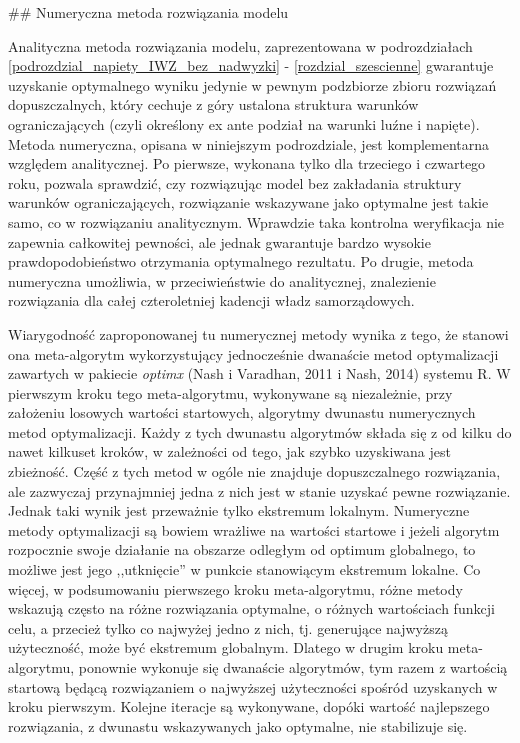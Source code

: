 ## Numeryczna metoda rozwiązania modelu
\label{rozdz_numeryczna_metoda}

Analityczna metoda rozwiązania modelu, zaprezentowana w podrozdziałach \ref{podrozdzial_napiety_IWZ_bez_nadwyzki} - \ref{rozdzial_szescienne} gwarantuje uzyskanie optymalnego wyniku jedynie w pewnym podzbiorze zbioru rozwiązań dopuszczalnych, który cechuje z góry ustalona struktura warunków ograniczających (czyli określony ex ante podział na warunki luźne i napięte). Metoda numeryczna, opisana w niniejszym podrozdziale, jest komplementarna względem analitycznej. Po pierwsze, wykonana tylko dla trzeciego i czwartego roku, pozwala sprawdzić, czy rozwiązując model bez zakładania struktury warunków ograniczających, rozwiązanie wskazywane jako optymalne jest takie samo, co w rozwiązaniu analitycznym. Wprawdzie taka kontrolna weryfikacja nie zapewnia całkowitej pewności, ale jednak gwarantuje bardzo wysokie prawdopodobieństwo otrzymania optymalnego rezultatu. Po drugie, metoda numeryczna umożliwia, w przeciwieństwie do analitycznej, znalezienie rozwiązania dla całej czteroletniej kadencji władz samorządowych.  

Wiarygodność zaproponowanej tu numerycznej metody wynika z tego, że stanowi ona meta-algorytm wykorzystujący jednocześnie dwanaście metod optymalizacji zawartych w pakiecie \textit{optimx} (Nash i Varadhan, 2011 i Nash, 2014)\nocite{Nash_Varadhan_2011}\nocite{Nash_2014} systemu R. W pierwszym kroku tego meta-algorytmu, wykonywane są niezależnie, przy założeniu losowych wartości startowych, algorytmy dwunastu numerycznych metod optymalizacji. Każdy z tych dwunastu algorytmów składa się z od kilku do nawet kilkuset kroków, w zależności od tego, jak szybko uzyskiwana jest zbieżność. Część z tych metod w ogóle nie znajduje dopuszczalnego rozwiązania, ale zazwyczaj przynajmniej jedna z nich jest w stanie uzyskać pewne rozwiązanie. Jednak taki wynik jest przeważnie tylko ekstremum lokalnym. Numeryczne metody optymalizacji są bowiem wrażliwe na wartości startowe i jeżeli algorytm rozpocznie swoje działanie na obszarze odległym od optimum globalnego, to możliwe jest jego ,,utknięcie'' w punkcie stanowiącym ekstremum lokalne. Co więcej, w podsumowaniu pierwszego kroku meta-algorytmu, różne metody wskazują często na różne rozwiązania optymalne, o różnych wartościach funkcji celu, a przecież tylko co najwyżej jedno z nich, tj. generujące najwyższą użyteczność, może być ekstremum globalnym. Dlatego w drugim kroku meta-algorytmu, ponownie wykonuje się dwanaście algorytmów, tym razem z wartością startową będącą rozwiązaniem o najwyższej użyteczności spośród uzyskanych w kroku pierwszym. Kolejne iteracje są wykonywane, dopóki wartość najlepszego rozwiązania, z dwunastu wskazywanych jako optymalne, nie stabilizuje się.     


